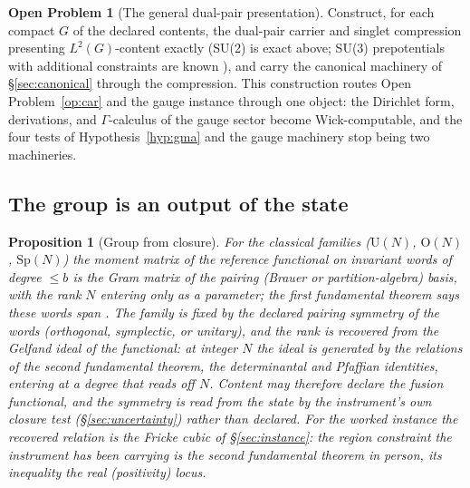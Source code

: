 \documentclass[11pt]{article}
\newtheorem{proposition}[theorem]{Proposition}
\theoremstyle{definition}
\newtheorem{openproblem}[theorem]{Open Problem}
\theoremstyle{remark}
\begin{document}
\begin{openproblem}[The general dual-pair presentation]
\label{op:dualpair}
Construct, for each compact $G$ of the declared contents, the dual-pair
carrier and singlet compression presenting $L^2(G)$-content exactly
(SU(2) is exact above; SU(3) prepotentials with additional constraints
are known \cite{anishetty}), and carry the canonical machinery of
\S\ref{sec:canonical} through the compression.  This construction
routes Open Problem~\ref{op:car} and the gauge instance through one
object: the Dirichlet form, derivations, and $\Gamma$-calculus of the
gauge sector become Wick-computable, and the four tests of
Hypothesis~\ref{hyp:gma} and the gauge machinery stop being two
machineries.
\end{openproblem}

\subsection{The group is an output of the state}
\begin{proposition}[Group from closure]\label{prop:groupclosure}
For the classical families ($\mathrm U(N)$, $\mathrm O(N)$,
$\mathrm{Sp}(N)$) the moment matrix of the reference functional on
invariant words of degree $\le b$ is the Gram matrix of the pairing
(Brauer or partition-algebra) basis, with the rank $N$ entering only as
a parameter; the first fundamental theorem says these words span
\cite{weylbook}.  The family is fixed by the declared pairing symmetry
of the words (orthogonal, symplectic, or unitary), and the rank is
recovered from the Gelfand ideal of the functional: at integer $N$ the
ideal is generated by the relations of the second fundamental theorem,
the determinantal and Pfaffian identities, entering at a degree that
reads off $N$.  Content may therefore declare the fusion functional,
and the symmetry is read from the state by the instrument's own closure
test (\S\ref{sec:uncertainty}) rather than declared.  For the worked
instance the recovered relation is the Fricke cubic of
\S\ref{sec:instance}: the region constraint the instrument has been
carrying is the second fundamental theorem in person, its inequality
the real (positivity) locus.
\end{proposition}
\end{document}
